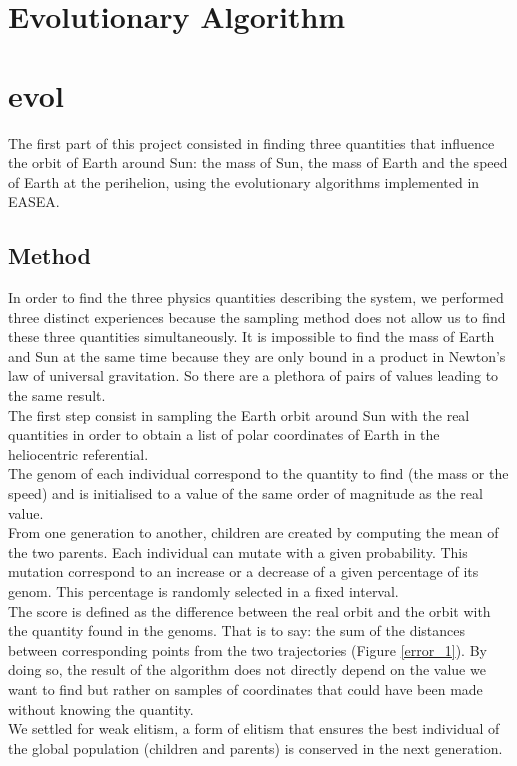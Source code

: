 \section{Evolutionary Algorithm}
\section{evol}
The first part of this project consisted in finding three quantities that
influence the orbit of Earth around Sun: the mass of Sun, the mass of Earth and
the speed of Earth at the perihelion, using the evolutionary algorithms
implemented in EASEA.\\

\subsection{Method}
In order to find the three physics quantities describing the system, we
performed three distinct experiences because the
sampling method does not allow us to find these three quantities
simultaneously. It is impossible to find the mass of Earth and Sun at the same
time because they are only bound in a product in Newton's law of universal
gravitation. So there are a plethora of pairs of values leading to the same
result.\\

The first step consist in sampling the Earth orbit around Sun with the real
quantities in order to obtain a list of polar coordinates of Earth in the
heliocentric referential.\\
The genom of each individual correspond to the quantity to find (the mass or
the speed) and is initialised to a value of the same order of magnitude as the
real value.\\
From one generation to another, children are created by computing the mean of
the two parents. Each individual can mutate with a given probability. This
mutation correspond to an increase or a decrease of a given percentage of its
genom. This percentage is randomly selected in a fixed interval.\\
The score is defined as the difference between the real orbit and the orbit
with the quantity found in the genoms. That is to say: the sum of the distances
between corresponding points from the two trajectories (Figure \ref{error_1}). By
doing so, the
result of the algorithm does not directly depend on the value we want to find
but rather on samples of coordinates that could have been made without knowing
the quantity.\\
We settled for weak elitism, a form of elitism that ensures the best individual
of the global population (children and parents) is conserved in the next
generation.

